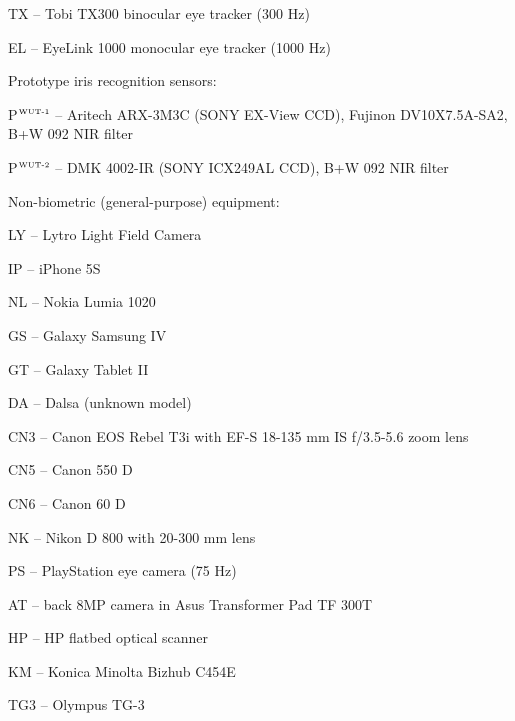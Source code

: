 \documentclass[format=acmsmall, review=false, timestamp=false]{acmart}
\begin{document}
\begin{landscape}
\begin{table}[htb!]
\begin{center}
\begin{threeparttable}
\begin{tablenotes}
\begin{minipage}{0.65\textwidth}
		\item TX -- Tobi TX300 binocular eye tracker (300 Hz)
		\item EL -- EyeLink 1000 monocular eye tracker (1000 Hz)	
		\item 
	    \item Prototype iris recognition sensors:
		\item P$^{\mbox{\tiny WUT-1}}$ -- Aritech ARX-3M3C (SONY EX-View CCD), Fujinon DV10X7.5A-SA2, B+W 092 NIR filter
		\item P$^{\mbox{\tiny WUT-2}}$ -- DMK 4002-IR (SONY ICX249AL CCD), B+W 092 NIR filter
		\end{minipage}
		\begin{minipage}{0.6\textwidth}
		\item Non-biometric (general-purpose) equipment:
		\item LY -- Lytro Light Field Camera		
		\item IP -- iPhone 5S
		\item NL -- Nokia Lumia 1020
		\item GS -- Galaxy Samsung IV
		\item GT -- Galaxy Tablet II
		\item DA -- Dalsa (unknown model)
		\item CN3 -- Canon EOS Rebel T3i with EF-S 18-135 mm IS f/3.5-5.6 zoom lens
		\item CN5 -- Canon 550 D
		\item CN6 -- Canon 60 D		
		\item NK -- Nikon D 800 with 20-300 mm lens
		\item PS -- PlayStation eye camera (75 Hz)
		\item AT -- back 8MP camera in Asus Transformer Pad TF 300T 
		\item HP -- HP flatbed optical scanner
		\item KM -- Konica Minolta Bizhub C454E
		\item TG3 -- Olympus TG-3
		\end{minipage}
		\end{tablenotes}
	\end{threeparttable}
    \end{center}
\end{table}

\end{landscape}




\end{document}
